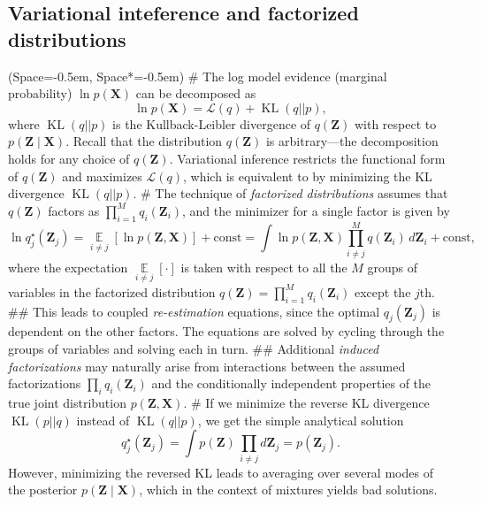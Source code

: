 \documentclass[12pt, a4paper]{article}
\newcommand{\listSpace}{-0.5em}%
\newcommand{\vect}[1]{\bm{#1}}
\DeclareMathOperator{\E}{\mathbb{E}}
\begin{document}
\subsection*{Variational inteference and factorized distributions}
\begin{easylist}[itemize]
	\ListProperties(Space=\listSpace, Space*=\listSpace)
	# The log model evidence (marginal probability) $\ln p(\vect{X})$ can be decomposed as
	\begin{equation*}
		\ln p(\vect{X}) = \mathcal{L}(q) + \operatorname{KL}(q || p),
	\end{equation*}
	where $\operatorname{KL}(q || p)$ is the Kullback-Leibler divergence of $q(\vect{Z})$ with respect to $p(\vect{Z} \mid \vect{X})$.
	Recall that the distribution $q(\vect{Z})$ is arbitrary---the decomposition holds for any choice of $q(\vect{Z})$.
	Variational inference restricts the functional form of $q(\vect{Z})$ and maximizes $\mathcal{L}(q)$, which is equivalent to by minimizing the KL divergence $\operatorname{KL}(q || p)$.
	# The technique of \emph{factorized distributions} assumes that $q(\vect{Z})$ factors as $\prod_{i=1}^{M} q_i (\vect{Z}_i)$, and the minimizer for a single factor is given by
	\begin{equation*}
		\ln q_j^{\star} (\vect{Z}_j) = \underset{i\neq j}{\E} 
		\left[ \ln p(\vect{Z}, \vect{X}) \right] + \text{const}
		= \int \ln p(\vect{Z}, \vect{X}) \prod_{i \neq j}^{M} q(\vect{Z}_i) \, d \vect{Z}_i
		+ \text{const}
		,
	\end{equation*}
	where the expectation $\underset{i\neq j}{\E}[\cdot]$ is taken with respect to all the $M$ groups of variables in the factorized distribution $q(\vect{Z}) = \prod_{i=1}^{M} q_i (\vect{Z}_i)$ except the $j$th.
	## This leads to coupled \emph{re-estimation} equations, since the optimal $q_j (\vect{Z}_j)$ is dependent on the other factors.
	The equations are solved by cycling through the groups of variables and solving each in turn.
	## Additional \emph{induced factorizations} may naturally arise from interactions between the assumed factorizations $\prod_i q_i (\vect{Z}_i)$ and the conditionally independent properties of the true joint distribution $p(\vect{Z}, \vect{X})$.
	# If we minimize the reverse KL divergence $\operatorname{KL}(p || q)$ instead of $\operatorname{KL}(q || p)$, we get the simple analytical solution
	\begin{equation*}
		q_j^{\star} (\vect{Z}_j) = \int p(\vect{Z}) \, \prod_{i \neq j}  d \vect{Z}_j = p(\vect{Z}_j).
	\end{equation*}
	However, minimizing the reversed KL leads to averaging over several modes of the posterior $p(\vect{Z} \mid \vect{X})$, which in the context of mixtures yields bad solutions.
\end{easylist}
\end{document}
